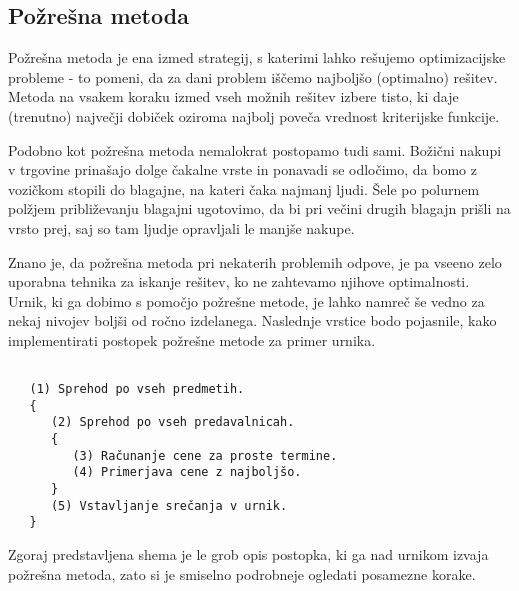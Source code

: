 \documentclass[a4paper,10pt]{article}
\begin{document}
\subsection{Požrešna metoda}

Požrešna metoda je ena izmed strategij, s katerimi lahko rešujemo optimizacijske probleme -
to pomeni, da za dani problem iščemo najboljšo (optimalno) rešitev. Metoda na vsakem koraku
izmed vseh možnih rešitev izbere  tisto, ki daje (trenutno) največji dobiček oziroma najbolj
poveča vrednost kriterijske funkcije.

Podobno kot požrešna metoda nemalokrat postopamo tudi sami. Božični nakupi v trgovine
prinašajo dolge čakalne vrste in ponavadi se odločimo, da bomo z vozičkom stopili do blagajne,
na kateri čaka najmanj ljudi. Šele po polurnem polžjem približevanju blagajni ugotovimo,
da bi pri večini drugih blagajn prišli na vrsto prej, saj so tam ljudje opravljali le
manjše nakupe.

Znano je, da požrešna metoda pri nekaterih problemih odpove, je pa vseeno zelo uporabna
tehnika za iskanje rešitev, ko ne zahtevamo njihove optimalnosti. Urnik, ki ga dobimo s
pomočjo požrešne metode, je lahko namreč še vedno za nekaj nivojev boljši od ročno izdelanega.
Naslednje vrstice bodo pojasnile, kako implementirati postopek požrešne metode za primer urnika.


\begin{verbatim}
   
   (1) Sprehod po vseh predmetih.
   {
      (2) Sprehod po vseh predavalnicah.
      {
         (3) Računanje cene za proste termine.
         (4) Primerjava cene z najboljšo.
      }
      (5) Vstavljanje srečanja v urnik.
   }
\end{verbatim}
\noindent
Zgoraj predstavljena shema je le grob opis postopka, ki ga nad urnikom izvaja požrešna metoda,
zato si je smiselno podrobneje ogledati posamezne korake.
\end{document}
